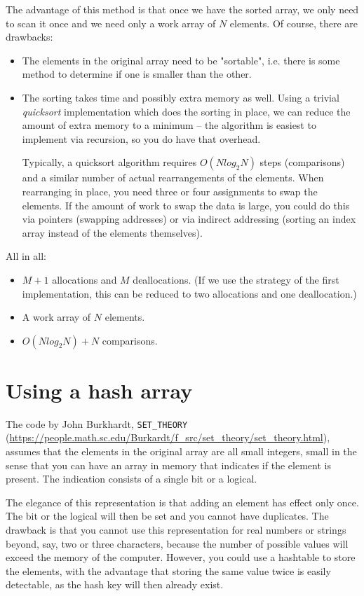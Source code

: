\documentclass[onecolumn]{article}
\begin{document}
The advantage of this method is that once we have the sorted array, we only need to scan it once and we need
only a work array of $N$ elements. Of course, there are drawbacks:
\begin{itemize}
\item
The elements in the original array need to be "sortable", i.e. there is some method to determine if one
is smaller than the other.
\item
The sorting takes time and possibly extra memory as well. Using a trivial \emph{quicksort} implementation
which does the sorting in place, we can reduce the amount of extra memory to a minimum -- the algorithm
is easiest to implement via recursion, so you do have that overhead.

Typically, a quicksort algorithm requires $O(N log_2 N)$ steps (comparisons) and a similar number of actual
rearrangements of the elements. When rearranging in place, you need three or four assignments to swap
the elements. If the amount of work to swap the data is large, you could do this via pointers (swapping
addresses) or via indirect addressing (sorting an index array instead of the elements themselves).
\end{itemize}

All in all:
\begin{itemize}
\item
$M+1$ allocations and $M$ deallocations. (If we use the strategy of the first implementation, this can be
reduced to two allocations and one deallocation.)
\item
A work array of $N$ elements.
\item
$O(N log_2 N) + N$ comparisons.
\end{itemize}


\section*{Using a hash array}
The code by John Burkhardt, \verb+SET_THEORY+ (\url{https://people.math.sc.edu/Burkardt/f_src/set_theory/set_theory.html}),
assumes that the elements in the original array are all small integers, small in the sense that you can have
an array in memory that indicates if the element is present. The indication consists of a single bit or a logical.

The elegance of this representation is that adding an element has effect only once. The bit or the logical will
then be set and you cannot have duplicates. The drawback is that you cannot use this representation for real numbers or
strings beyond, say, two or three characters, because the number of possible values will exceed the memory of
the computer. However, you could use a hashtable to store the elements, with the advantage that storing the
same value twice is easily detectable, as the hash key will then already exist.
\end{document}
